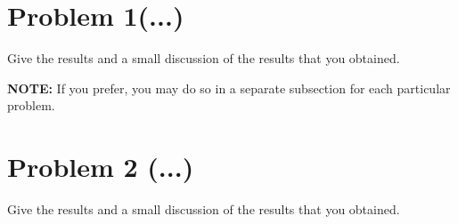 \documentclass[11pt]{article}
\begin{document}
\newpage

\section{Problem 1(...)}
Give the results and a small discussion of the results that you obtained.

{\bf NOTE:} If you prefer, you may do so in 
a separate subsection for each particular problem.

\section{Problem 2 (...)}
Give the results and a small discussion of the results that you obtained.
\end{document}
